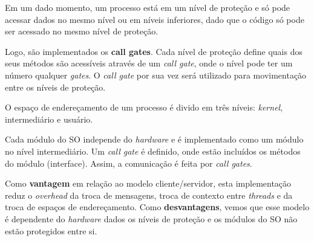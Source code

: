 Em um dado momento, um processo está em um nível de proteção e só pode acessar dados no mesmo nível ou em níveis inferiores, dado que o código só pode ser acessado no mesmo nível de proteção.

Logo, são implementados os \textbf{call gates}. Cada nível de proteção define quais dos seus métodos são acessíveis através de um \textit{call gate}, onde o nível pode ter um número qualquer \textit{gates}. O \textit{call gate} por sua vez será utilizado para movimentação entre os níveis de proteção.

O espaço de endereçamento de um processo é divido em três níveis: \textit{kernel}, intermediário e usuário.

Cada módulo do SO independe do \textit{hardware} e é implementado como um módulo no nível intermediário. Um \textit{call gate} é definido, onde estão incluídos os métodos do módulo (interface). Assim, a comunicação é feita por \textit{call gates}.

Como \textbf{vantagem} em relação ao modelo cliente/servidor, esta implementação reduz o \textit{overhead} da troca de mensagens, troca de contexto entre \textit{threads} e da troca de espaços de endereçamento. Como \textbf{desvantagens}, vemos que esse modelo é dependente do \textit{hardware} dados os níveis de proteção e os módulos do SO não estão protegidos entre si.
